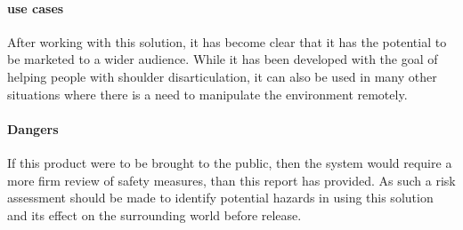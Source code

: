 \paragraph{use cases}
    After working with this solution, it has become clear that it has the potential to be marketed to a wider audience. While it has been developed with the goal of helping people with shoulder disarticulation, it can also be used in many other situations where there is a need to manipulate the environment remotely.
\paragraph{Dangers}
If this product were to be brought to the public, then the system would require a more firm review of safety measures, than this report has provided. As such a risk assessment should be made to identify potential hazards in using this solution and its effect on the surrounding world before release.


